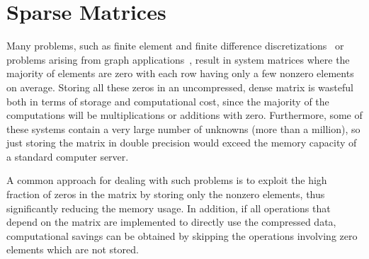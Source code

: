 \section{Sparse Matrices}
\label{introduction:sec:sparse}

Many problems, such as finite element and finite difference
discretizations~\cite{saad,duff} or problems arising from graph
applications~\cite{kepner}, result in system matrices where the majority of
elements are zero with each row having only a few nonzero elements on average.
Storing all these zeros in an uncompressed, dense matrix is wasteful both in
terms of storage and computational cost, since the majority of the computations
will be multiplications or additions with zero. Furthermore, some of these
systems contain a very large number of unknowns (more than a million), so just
storing the matrix in double precision would exceed the memory capacity of a
standard computer server.

A common approach for dealing with such problems is to exploit the high fraction
of zeros in the matrix by storing only the nonzero elements, thus significantly
reducing the memory usage. In addition, if all operations that depend on the
matrix are implemented to directly use the compressed data, computational
savings can be obtained by skipping the operations involving zero elements
which are not stored.

